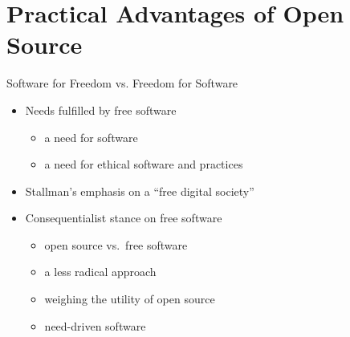 \section{Practical Advantages of Open Source}\frame{\sectionpage}

\begin{frame}{Software for Freedom vs. Freedom for Software}
    \begin{itemize}
      \item Needs fulfilled by free software
        \begin{itemize}
          \item a need for software
          \item a need for ethical software and practices
        \end{itemize}
      \item Stallman's emphasis on a ``free digital society''
      \item Consequentialist stance on free software
        \begin{itemize}
          \item open source vs.\ free software
          \item a less radical approach
          \item weighing the utility of open source
          \item need-driven software~\cite[p. 17]{bisson}
        \end{itemize}
    \end{itemize}
\end{frame}



